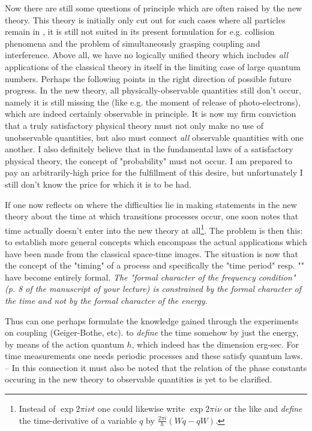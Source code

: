 Now there are still some questions of principle which are often raised by the new theory. This theory is initially only cut out for such cases where all particles remain in , it is still not suited in its present formulation for e.g. collision phenomena and the problem of simultaneously grasping coupling and interference. Above all, we have no logically unified theory which includes \textit{all} applications of the classical theory in itself in the limiting case of large quantum numbers. Perhaps the following points in the right direction of possible future progress. In the new theory, all physically-observable quantities still don't  occur, namely it is still missing the  (like e.g. the moment of release of photo-electrons), which are indeed certainly observable in principle. It is now my firm conviction that a truly satisfactory physical theory must not only make no use of unobservable quantities, but also must connect \textit{all} observable quantities with one another. I also definitely believe that in the fundamental laws of a satisfactory physical theory, the concept of "probability" must not occur. I am prepared to pay an arbitrarily-high price for the fulfillment of this desire, but unfortunately I still don't know the price for which it is to be had.

If one now reflects on where the difficulties lie in making statements in the new theory about the time at which transitions processes occur, one soon notes that time actually doesn't enter into the new theory at all\footnote{Instead of $\exp{2\pi i \nu t}$ one could likewise write $\exp{2\pi i \nu}$ or the like and \textit{define} the time-derivative of a variable $q$ by $\frac{2\pi i}{h}(Wq-qW)$.}. The problem is then this: to establish more general concepts which encompass the actual applications which have been made from the classical space-time images. The situation is now that the concept of the "timing" of a process and specifically the "time period" resp. "" have become entirely formal. \textit{The "formal character of the frequency condition" (p. 8 of the manuscript of your lecture) is constrained by the formal character of the time and not by the formal character of the energy.}

Thus can one perhaps formulate the knowledge gained through the experiments on coupling (Geiger-Bothe, etc).  to \textit{define} the time somehow by just the energy, by means of the action quantum $h$, which indeed has the dimension erg-sec. For time measurements one needs periodic processes and these satisfy quantum laws. -- In this connection it must also be noted that the relation of the phase constants occuring in the new theory to observable quantities is yet to be clarified.

